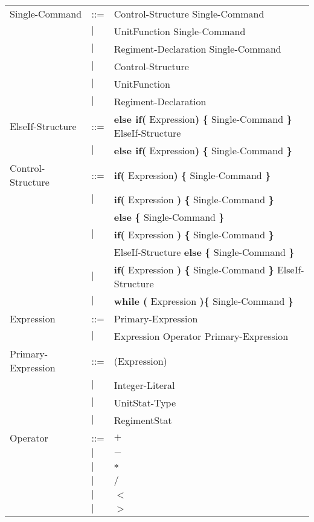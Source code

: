 \begin{center}
\begin{longtable}{l l l}
		Single-Command				&	::=	&Control-Structure Single-Command \\
									&$\mid$	& UnitFunction Single-Command\\
									&$\mid$	&Regiment-Declaration Single-Command\\
									&$\mid$	&Control-Structure \\
									&$\mid$	& UnitFunction \\
									&$\mid$	& Regiment-Declaration \\
		ElseIf-Structure			&	::=	&{\bf else if( } Expression{\bf )} {\bf \{ } Single-Command {\bf \} } ElseIf-Structure\\
									&$\mid$	&{\bf else if( } Expression{\bf )} {\bf \{ } Single-Command {\bf \} } \\
		Control-Structure			&	::=	&{\bf if( } Expression{\bf )} {\bf \{ } Single-Command {\bf \} }  \\
									&$\mid$	&{\bf if(} Expression {\bf )} {\bf \{ }Single-Command {\bf \}} \\
									&		&{\bf else } {\bf \{ }Single-Command {\bf \} } \\			
									&$\mid$	&{\bf if(} Expression {\bf )} {\bf \{ }Single-Command {\bf \}} \\
									&		&ElseIf-Structure {\bf else } {\bf \{ }Single-Command {\bf \} } \\
									&$\mid$	&{\bf if(} Expression {\bf )} {\bf \{ }Single-Command {\bf \}} ElseIf-Structure \\	
									&$\mid$	&{\bf while (} Expression {\bf )}{\bf \{ } Single-Command {\bf \}} \\
		Expression					&	::=	&Primary-Expression \\
									&$\mid$	&Expression Operator Primary-Expression \\
		Primary-Expression			&	::=	&(Expression)\\
									&$\mid$	&Integer-Literal \\
									&$\mid$	&UnitStat-Type \\
									&$\mid$	&RegimentStat \\
		Operator					&	::=	&$\boldsymbol {+}$\\
									&$\mid$	&$\boldsymbol {-}$\\
									&$\mid$	&$\boldsymbol {*}$\\
									&$\mid$	&$\boldsymbol {/}$\\
									&$\mid$	&$\boldsymbol {<}$\\
									&$\mid$	&$\boldsymbol {>}$\\

\end{longtable}
\end{center}
